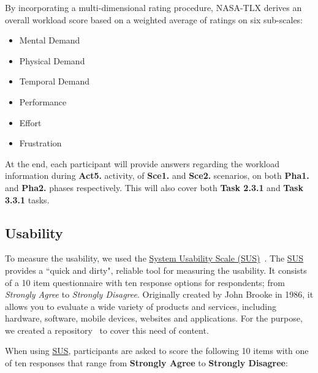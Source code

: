 \hfill

By incorporating a multi-dimensional rating procedure, NASA-TLX derives an overall workload score based on a weighted average of ratings on six sub-scales:

\begin{itemize}
\item Mental Demand
\item Physical Demand
\item Temporal Demand
\item Performance
\item Effort
\item Frustration 
\end{itemize}

At the end, each participant will provide answers regarding the workload information during {\bf Act5.} activity, of {\bf Sce1.} and {\bf Sce2.} scenarios, on both {\bf Pha1.} and {\bf Pha2.} phases respectively. This will also cover both {\bf Task 2.3.1} and {\bf Task 3.3.1} tasks.

\subsection{Usability}

To measure the usability, we used the \hyperlink{https://en.wikipedia.org/wiki/System_usability_scale}{System Usability Scale (SUS)}~\cite{orfanou2015perceived}. The \hyperlink{https://en.wikipedia.org/wiki/System_usability_scale}{SUS} provides a ``quick and dirty", reliable tool for measuring the usability. It consists of a 10 item questionnaire with ten response options for respondents; from {\it Strongly Agree} to {\it Strongly Disagree}. Originally created by John Brooke in 1986, it allows you to evaluate a wide variety of products and services, including hardware, software, mobile devices, websites and applications. For the purpose, we created a repository~\cite{https://doi.org/10.13140/rg.2.2.26978.79044, francisco_maria_calisto_2018_1435042} to cover this need of content.

\hfill

When using \hyperlink{https://en.wikipedia.org/wiki/System_usability_scale}{SUS}, participants are asked to score the following 10 items with one of ten responses that range from {\bf Strongly Agree} to {\bf Strongly Disagree}:

